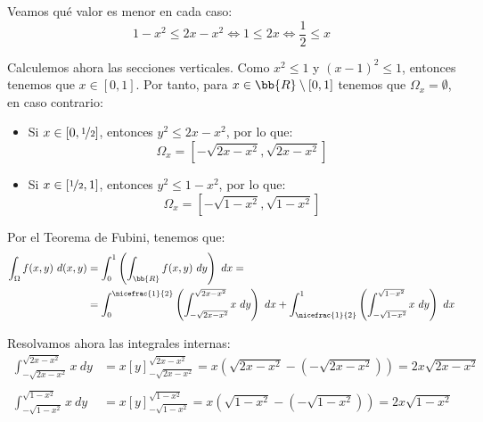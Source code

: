 \begin{ejercicio}
\begin{enumerate}
        Veamos qué valor es menor en cada caso:
        \begin{equation*}
            1-x^2 \leq 2x-x^2 \iff 1 \leq 2x \iff \frac{1}{2} \leq x
        \end{equation*}

        Calculemos ahora las secciones verticales. Como $x^2\leq 1$ y $(x-1)^2\leq 1$, entonces tenemos que
        $x\in [0,1]$. Por tanto, para $x\in \bb{R}\setminus [0,1]$ tenemos que $\Omega_x=\emptyset$, en caso contrario:
        \begin{itemize}
            \item Si $x\in [0,\nicefrac{1}{2}]$, entonces $y^2\leq 2x-x^2$, por lo que:
            \begin{equation*}
                \Omega_x = \left[ -\sqrt{2x-x^2}, \sqrt{2x-x^2} \right]
            \end{equation*}

            \item Si $x\in [\nicefrac{1}{2},1]$, entonces $y^2\leq 1-x^2$, por lo que:
            \begin{equation*}
                \Omega_x = \left[ -\sqrt{1-x^2}, \sqrt{1-x^2} \right]
            \end{equation*}
        \end{itemize}
        
        Por el Teorema de Fubini, tenemos que:
        \begin{align*}
            \int_{\Omega} f(x, y)~d(x, y) &= \int_{0}^{1} \left( \int_{\bb{R}} f(x,y)~dy \right)~dx =\\
            &= \int_{0}^{\nicefrac{1}{2}} \left( \int_{-\sqrt{2x-x^2}}^{\sqrt{2x-x^2}} x~dy \right)~dx +
            \int_{\nicefrac{1}{2}}^{1} \left( \int_{-\sqrt{1-x^2}}^{\sqrt{1-x^2}} x~dy \right)~dx
        \end{align*}

        Resolvamos ahora las integrales internas:
        \begin{align*}
            \int_{-\sqrt{2x-x^2}}^{\sqrt{2x-x^2}} x~dy
            &= x\left[ y \right]_{-\sqrt{2x-x^2}}^{\sqrt{2x-x^2}} = x\left( \sqrt{2x-x^2} - (-\sqrt{2x-x^2}) \right) = 2x\sqrt{2x-x^2} \\ \\
            \int_{-\sqrt{1-x^2}}^{\sqrt{1-x^2}} x~dy
            &= x\left[ y \right]_{-\sqrt{1-x^2}}^{\sqrt{1-x^2}} = x\left( \sqrt{1-x^2} - (-\sqrt{1-x^2}) \right) = 2x\sqrt{1-x^2}
        \end{align*}


\end{enumerate}
\end{ejercicio}
